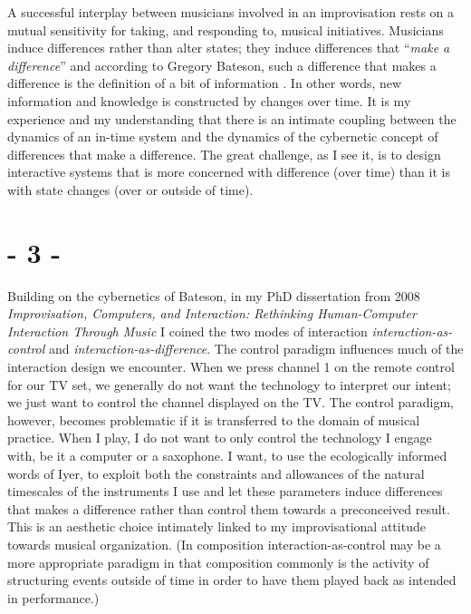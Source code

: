 \documentclass{article}
\begin{document}
A successful interplay between musicians involved in an improvisation rests on a mutual sensitivity for taking, and responding to, musical initiatives. Musicians induce differences rather than alter states; they induce differences that ``\emph{make a difference}'' and according to Gregory Bateson, such a difference that makes a difference is the definition of a bit of information \citep[92]{Bateson}. In other words, new information and knowledge is constructed by changes over time. It is my experience and my understanding that there is an intimate coupling between the dynamics of an in-time system and the dynamics of the cybernetic concept of differences that make a difference. The great challenge, as I see it, is to design interactive systems that is more concerned with difference (over time) than it is with state changes (over or outside of time).


\section*{- 3 -}
\label{sec:-3-}


Building on the cybernetics of Bateson, in my PhD dissertation from 2008 \emph{Improvisation, Computers, and Interaction: Rethinking Human-Computer Interaction Through Music} \cite{frisk08} I coined the two modes of interaction \emph{interaction-as-control} and \emph{interaction-as-difference}. The control paradigm influences much of the interaction design we encounter. When we press channel 1 on the remote control for our TV set, we generally do not want the technology to interpret our intent; we just want to control the channel displayed on the TV. The control paradigm, however, becomes problematic if it is transferred to the domain of musical practice. When I play, I do not want to only control the technology I engage with, be it a computer or a saxophone. I want, to use the ecologically informed words of Iyer, to exploit both the constraints and allowances of the natural timescales of the instruments I use and let these parameters induce differences that makes a difference rather than control them towards a preconceived result. This is an aesthetic choice intimately linked to my improvisational attitude towards musical organization. (In composition interaction-as-control may be a more appropriate paradigm in that composition commonly is the activity of structuring events outside of time in order to have them played back as intended in performance.)
\end{document}
